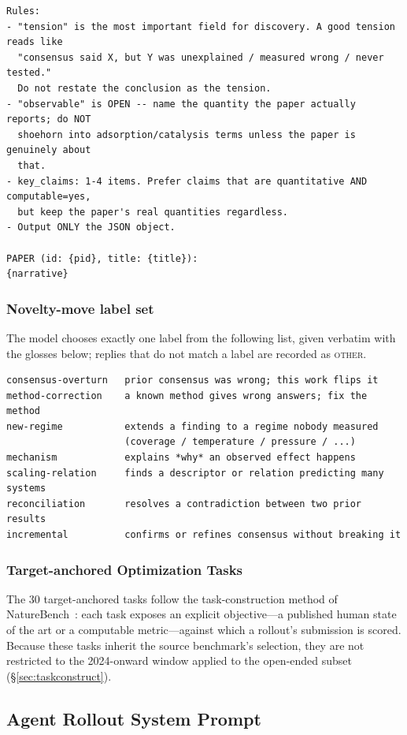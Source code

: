 \begin{lstlisting}[style=prompt]
Rules:
- "tension" is the most important field for discovery. A good tension reads like
  "consensus said X, but Y was unexplained / measured wrong / never tested."
  Do not restate the conclusion as the tension.
- "observable" is OPEN -- name the quantity the paper actually reports; do NOT
  shoehorn into adsorption/catalysis terms unless the paper is genuinely about
  that.
- key_claims: 1-4 items. Prefer claims that are quantitative AND computable=yes,
  but keep the paper's real quantities regardless.
- Output ONLY the JSON object.

PAPER (id: {pid}, title: {title}):
{narrative}
\end{lstlisting}

\subsubsection{Novelty-move label set}
\label{app:moves}

The model chooses exactly one label from the following list, given verbatim with the glosses
below; replies that do not match a label are recorded as \textsc{other}.

\begin{lstlisting}[style=prompt]
consensus-overturn   prior consensus was wrong; this work flips it
method-correction    a known method gives wrong answers; fix the method
new-regime           extends a finding to a regime nobody measured
                     (coverage / temperature / pressure / ...)
mechanism            explains *why* an observed effect happens
scaling-relation     finds a descriptor or relation predicting many systems
reconciliation       resolves a contradiction between two prior results
incremental          confirms or refines consensus without breaking it
\end{lstlisting}


\subsubsection{Target-anchored Optimization Tasks}
The 30 target-anchored tasks follow the task-construction method of NatureBench~\citep{wang2026naturebench}: each task exposes an explicit objective---a published human state of the art or a computable metric---against which a rollout's submission is scored. Because these tasks inherit the source benchmark's selection, they are not restricted to the 2024-onward window applied to the open-ended subset (\S\ref{sec:taskconstruct}).
\subsection{Agent Rollout System Prompt}
\label{app:prompt:system}

